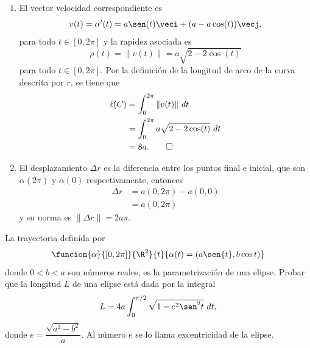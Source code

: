 \documentclass[a4,11pt]{aleph-examen}
\begin{document}
\begin{preguntas}
\begin{respuesta}
	\begin{enumerate}
	  \item
	 	El vector velocidad correspondiente es
    	\[
       		v(t)=\alpha'(t)= a \sen(t) \veci+(a-a \cos (t)) \vecj,
        \]
    	para todo $t\in[0,2\pi]$ y la rapidez asociada es
    	\[
            \rho(t) = \| v(t) \| = a \sqrt{2-2\cos(t)} 
      	\]
    	para todo $t\in\left[0,2\pi\right]$. Por la definición de la longitud de arco de la curva descrita por $r$, se tiene que
    	\begin{align*}
    		\ell(C)
                & =\int_0^{2\pi} \|v(t)\|\ dt\\
                & =\int_0^{2\pi}a \sqrt{2-2\cos(t)}\  dt\\
                & =8a.\qedhere
        \end{align*}
    \item
        El desplazamiento $\Delta r$ es la diferencia entre los puntos final e inicial, que son $\alpha(2\pi)$ y $\alpha(0)$ respectivamente, entonces
        \begin{align*}
            \Delta r&=a(0,2\pi)-a(0,0)\\
            &=a(0,2\pi)
        \end{align*}
        y su norma es $\| \Delta r\|=2a\pi$.
    \end{enumerate}
\end{respuesta}



\item 
    La trayectoria definida por
	\[
        \funcion{\alpha}{[0, 2\pi]}{\R^2}{t}
        {\alpha(t) = (a\sen{t}, b\cos{t})}
	\]
    donde $0 < b < a$ son números reales, es la parametrización de una elipse. Probar que la longitud $L$ de una elipse está dada por la integral
    \[
        L = 4a\int_{0}^{\pi/2}{\sqrt{1 - e^{2}\sen^{2}{t}}\ dt,}
    \]
    donde $e = \dfrac{\sqrt{a^{2} - b^{2}}}{a}$. Al número $e$ se lo llama excentricidad de la elipse.


\end{preguntas}
\end{document}
